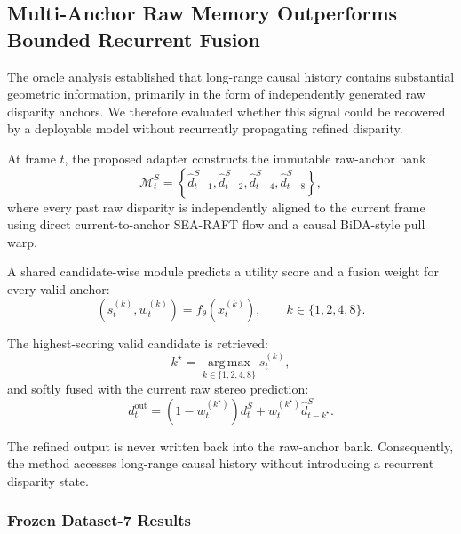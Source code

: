 \documentclass[11pt,a4paper]{article}
\begin{document}
\subsection{Multi-Anchor Raw Memory Outperforms Bounded Recurrent Fusion}
\label{sec:multi_anchor_realizable}

The oracle analysis established that long-range causal history contains substantial
geometric information, primarily in the form of independently generated raw disparity
anchors. We therefore evaluated whether this signal could be recovered by a deployable
model without recurrently propagating refined disparity.

At frame \(t\), the proposed adapter constructs the immutable raw-anchor bank
\begin{equation}
    \mathcal{M}^{S}_{t}
    =
    \left\{
        \hat d^{S}_{t-1},
        \hat d^{S}_{t-2},
        \hat d^{S}_{t-4},
        \hat d^{S}_{t-8}
    \right\},
\end{equation}
where every past raw disparity is independently aligned to the current frame using
direct current-to-anchor SEA-RAFT flow and a causal BiDA-style pull warp.

A shared candidate-wise module predicts a utility score and a fusion weight for every
valid anchor:
\begin{equation}
    \left(s_t^{(k)}, w_t^{(k)}\right)
    =
    f_{\theta}\left(x_t^{(k)}\right),
    \qquad
    k\in\{1,2,4,8\}.
\end{equation}

The highest-scoring valid candidate is retrieved:
\begin{equation}
    k^\star
    =
    \operatorname*{arg\,max}_{k\in\{1,2,4,8\}}
    s_t^{(k)},
\end{equation}
and softly fused with the current raw stereo prediction:
\begin{equation}
    d_t^{\mathrm{out}}
    =
    \left(1-w_t^{(k^\star)}\right)d_t^{S}
    +
    w_t^{(k^\star)}\hat d^{S}_{t-k^\star}.
\end{equation}

The refined output is never written back into the raw-anchor bank. Consequently, the
method accesses long-range causal history without introducing a recurrent disparity
state.

\subsubsection{Frozen Dataset-7 Results}
\end{document}
